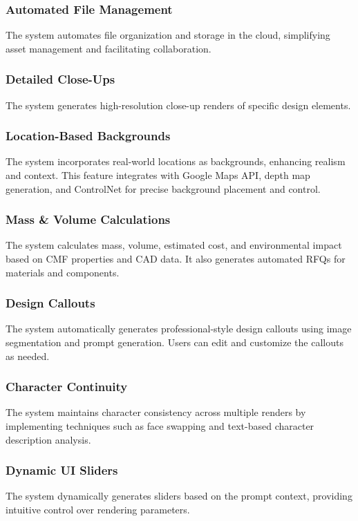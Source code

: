 \documentclass{article}
\begin{document}
\subsubsection{Automated File Management}
The system automates file organization and storage in the cloud, simplifying asset management and facilitating collaboration.

\subsubsection{Detailed Close-Ups}
The system generates high-resolution close-up renders of specific design elements.

\subsubsection{Location-Based Backgrounds}
The system incorporates real-world locations as backgrounds, enhancing realism and context. This feature integrates with Google Maps API, depth map generation, and ControlNet for precise background placement and control.

\subsubsection{Mass \& Volume Calculations}
The system calculates mass, volume, estimated cost, and environmental impact based on CMF properties and CAD data. It also generates automated RFQs for materials and components.

\subsubsection{Design Callouts}
The system automatically generates professional-style design callouts using image segmentation and prompt generation. Users can edit and customize the callouts as needed.

\subsubsection{Character Continuity}
The system maintains character consistency across multiple renders by implementing techniques such as face swapping and text-based character description analysis.

\subsubsection{Dynamic UI Sliders}
The system dynamically generates sliders based on the prompt context, providing intuitive control over rendering parameters.
\end{document}
